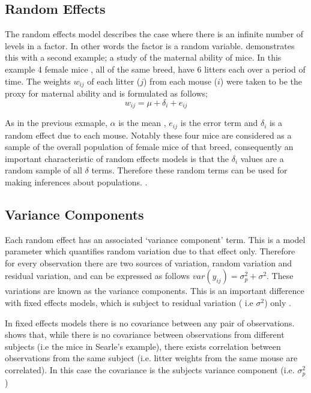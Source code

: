 \documentclass[12pt, a4paper]{report}
\theoremstyle{plain}
\theoremstyle{definition}
\theoremstyle{remark}
\begin{document}
\subsection{Random Effects}
The random effects model describes the case where there is an
infinite number of levels in a factor. In other words the factor
is a random variable. \citet{Searle} demonstrates this with a
second example; a study of the maternal ability of mice. In this
example 4 female mice , all of the same breed, have 6 litters each
over a period of time. The weights $w_{ij}$ of each litter ($j$)
from each mouse ($i$) were taken to be the proxy for maternal
ability and is formulated as follows;
\begin{equation}
w_{ij} = \mu + \delta_{i} + e_{ij}
\end{equation}

As in the previous exmaple, $\alpha$ is the mean , $e_{ij}$ is the
error term and $\delta_{i}$ is a random effect due to each mouse.
Notably these four mice are considered as a sample of the overall
population of female mice of that breed, consequently an important
characteristic of random effects models is that the $\delta_{i}$
values are a random sample of all $\delta$ terms. Therefore these
random terms can be used for making inferences about populations.
\citep{McCullSearle}.

\subsection{Variance Components}
Each random effect has an associated `variance component' term.
This is a model parameter which quantifies random variation due to
that effect only. Therefore for every observation there are two
sources of variation, random variation and residual variation, and
can be expressed as follows $var(y_{ij})=\sigma^{2}_{p} +
\sigma^{2}$. These variations are known as the variance
components. This is an important difference with fixed effects
models, which is subject to residual variation ( i.e $\sigma^{2}$)
only \citep{BrownPrescott}.

In fixed effects models there is no covariance between any pair of
observations. \citet*{BrownPrescott} shows that, while there is no
covariance between observations from different subjects (i.e the
mice in Searle's example), there exists correlation between
observations from the same subject (i.e. litter weights from the
same mouse are correlated). In this case the covariance is the
subjects variance component (i.e. $\sigma^{2}_{p}$)
\end{document}
